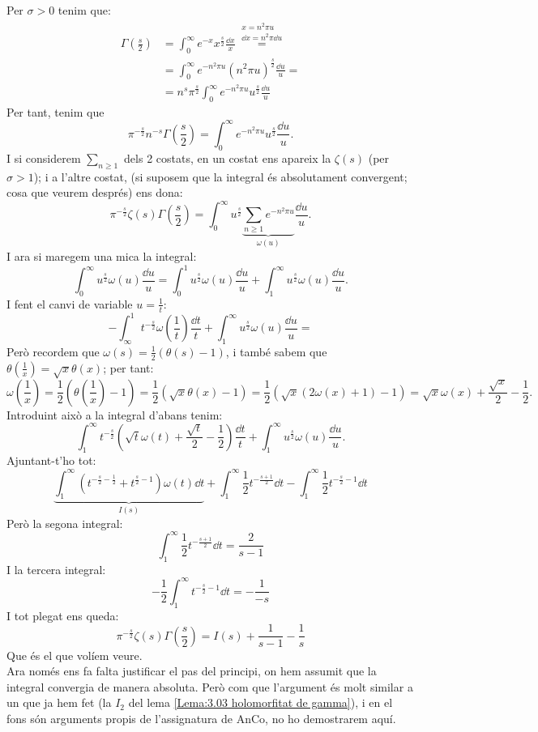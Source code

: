 \begin{pf}
    Per $\sigma>0$ tenim que:
    \begin{align*}
        \Gamma\left(\frac{s}{2}\right)&=\int_0^\infty e^{-x}x^{\frac{s}{2}}\frac{\dd x}{x}\overset{\substack{x=n^2\pi u\\\dd x=n^2\pi \dd u}}{=}\\
        &=\int_0^\infty e^{-n^2\pi u}(n^2\pi u)^{\frac{s}{2}}\frac{\dd u}{u}=\\
        &=n^s\pi^{\frac{s}{2}}\int_0^\infty e^{-n^2\pi u}u^{\frac{s}{2}}\frac{\dd u}{u}
    \end{align*}
    Per tant, tenim que 
    \[
        \pi^{-\frac{s}{2}}n^{-s}\Gamma\left(\frac{s}{2}\right)=\int_0^\infty e^{-n^2\pi u}u^{\frac{s}{2}}\frac{\dd u}{u}.
    \]
    I si considerem $\sum_{n\geq1}$ dels 2 costats, en un costat ens apareix la $\zeta(s)$ (per $\sigma>1$); i a l'altre costat, (si suposem que la integral és absolutament convergent; cosa que veurem després) ens dona:
    \[
        \pi^{-\frac{s}{2}}\zeta(s)\Gamma\left(\frac{s}{2}\right)=
        \int_0^\infty u^{\frac{s}{2}}\underbrace{\sum_{n\geq1}e^{-n^2\pi u}}_{\omega(u)}\frac{\dd u}{u}.
    \]
    I ara si maregem una mica la integral:
    \[
        \int_0^\infty u^{\frac{s}{2}}\omega(u)\frac{\dd u}{u}=
        \int_0^1 u^{\frac{s}{2}}\omega(u)\frac{\dd u}{u}+
        \int_1^\infty u^{\frac{s}{2}}\omega(u)\frac{\dd u}{u}.
    \]
    I fent el canvi de variable $u=\frac{1}{t}$:
    \[
        -\int_\infty^1 t^{-\frac{s}{2}}\omega\left(\frac{1}{t}\right)\frac{\dd t}{t}+
        \int_1^\infty u^{\frac{s}{2}}\omega(u)\frac{\dd u}{u}=
    \]
    Però recordem que $\omega\left(s\right)=\frac{1}{2}(\theta\left(s\right)-1)$, i també sabem que $\theta\left(\frac{1}{x}\right)=\sqrt{x}\theta(x)$; per tant:
    \[
        \omega\left(\frac{1}{x}\right)=
        \frac{1}{2}\left(\theta\left(\frac{1}{x}\right)-1\right)=
        \frac{1}{2}\left(\sqrt{x}\theta(x)-1\right)=
        \frac{1}{2}\left(\sqrt{x}(2\omega(x)+1)-1\right)=
        \sqrt{x}\omega(x)+\frac{\sqrt{x}}{2}-\frac{1}{2}.
    \]
    Introduint això a la integral d'abans tenim:
    \[
        \int^\infty_1 t^{-\frac{s}{2}}\left(\sqrt{t}\omega(t)+\frac{\sqrt{t}}{2}-\frac{1}{2}\right)\frac{\dd t}{t}+
        \int_1^\infty u^{\frac{s}{2}}\omega(u)\frac{\dd u}{u}.
    \]
    Ajuntant-t'ho tot:
    \[
        \underbrace{\int^\infty_1 (t^{-\frac{s}{2}-\frac{1}{2}}+t^{\frac{s}{2}-1})\omega(t)\dd t}_{I(s)}+\int^\infty_1 \frac{1}{2}t^{-\frac{s+1}{2}}\dd t-\int^\infty_1 \frac{1}{2}t^{-\frac{s}{2}-1}\dd t
    \]
    Però la segona integral:
    \[
        \int^\infty_1 \frac{1}{2}t^{-\frac{s+1}{2}}\dd t=\frac{2}{s-1}
    \]
    I la tercera integral:
    \[
        -\frac{1}{2}\int^\infty_1 t^{-\frac{s}{2}-1}\dd t=-\frac{1}{-s}
    \]
    I tot plegat ens queda:
    \[
        \pi^{-\frac{s}{2}}\zeta(s)\Gamma\left(\frac{s}{2}\right)=I(s)+\frac{1}{s-1}-\frac{1}{s}
    \]
    Que és el que volíem veure.\\
    Ara només ens fa falta justificar el pas del principi, on hem assumit que la integral convergia de manera absoluta. Però com que l'argument és molt similar a un que ja hem fet (la $I_2$ del lema \ref{Lema:3.03 holomorfitat de gamma}), i en el fons són arguments propis de l'assignatura de AnCo, no ho demostrarem aquí.
\end{pf}
